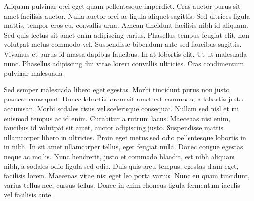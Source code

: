 Aliquam pulvinar orci eget quam pellentesque imperdiet. Cras auctor purus sit amet facilisis auctor. Nulla auctor orci ac ligula aliquet sagittis. Sed ultrices ligula mattis, tempor eros eu, convallis urna. Aenean tincidunt facilisis nibh id aliquam. Sed quis lectus sit amet enim adipiscing varius. Phasellus tempus feugiat elit, non volutpat metus commodo vel. Suspendisse bibendum ante sed faucibus sagittis. Vivamus et purus id massa dapibus faucibus. In at lobortis elit. Ut ut malesuada nunc. Phasellus adipiscing dui vitae lorem convallis ultricies. Cras condimentum pulvinar malesuada.

Sed semper malesuada libero eget egestas. Morbi tincidunt purus non justo posuere consequat. Donec lobortis lorem sit amet est commodo, a lobortis justo accumsan. Morbi sodales risus vel scelerisque consequat. Nullam sed nisl et mi euismod tempus ac id enim. Curabitur a rutrum lacus. Maecenas nisi enim, faucibus id volutpat sit amet, auctor adipiscing justo. Suspendisse mattis ullamcorper libero in ultricies. Proin eget metus sed odio pellentesque lobortis in in nibh. In sit amet ullamcorper tellus, eget feugiat nulla. Donec congue egestas neque ac mollis. Nunc hendrerit, justo et commodo blandit, est nibh aliquam nibh, a sodales odio ligula sed odio. Duis quis arcu tempus, egestas diam eget, facilisis lorem. Maecenas vitae nisi eget leo porta varius. Nunc eu quam tincidunt, varius tellus nec, cursus tellus. Donec in enim rhoncus ligula fermentum iaculis vel facilisis ante.